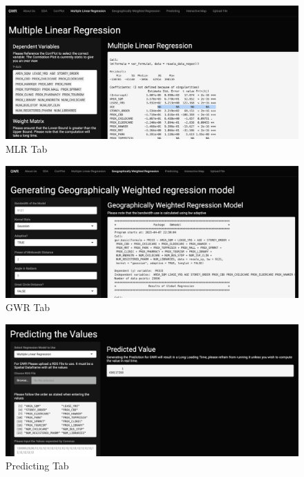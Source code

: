 \documentclass[manuscript,screen]{acmart}
\begin{document}
\begin{figure}

{\centering \includegraphics{images/Screenshot 2023-04-14 at 11.42.39 PM.png}

}

\caption{\label{fig-4}MLR Tab}

\end{figure}

\begin{figure}

{\centering \includegraphics{images/Screenshot 2023-04-14 at 11.57.14 PM.png}

}

\caption{\label{fig-5}GWR Tab}

\end{figure}

\begin{figure}

{\centering \includegraphics{images/Screenshot 2023-04-15 at 12.01.01 AM.png}

}

\caption{\label{fig-6}Predicting Tab}

\end{figure}
\end{document}
